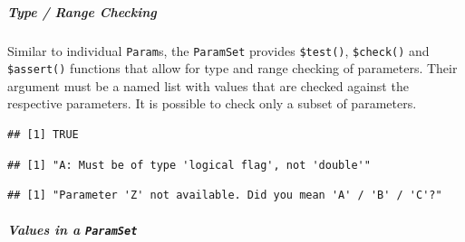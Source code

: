 \documentclass[]{article}
\newenvironment{Shaded}{\begin{snugshade}}{\end{snugshade}}
\newcommand{\DataTypeTok}[1]{\textcolor[rgb]{0.13,0.29,0.53}{#1}}
\newcommand{\DecValTok}[1]{\textcolor[rgb]{0.00,0.00,0.81}{#1}}
\newcommand{\KeywordTok}[1]{\textcolor[rgb]{0.13,0.29,0.53}{\textbf{#1}}}
\newcommand{\NormalTok}[1]{#1}
\newcommand{\OperatorTok}[1]{\textcolor[rgb]{0.81,0.36,0.00}{\textbf{#1}}}
\newcommand{\OtherTok}[1]{\textcolor[rgb]{0.56,0.35,0.01}{#1}}
\let\oldsubparagraph\subparagraph
\renewcommand{\subparagraph}[1]{\oldsubparagraph{#1}\mbox{}}
\renewenvironment{Shaded} {\begin{snugshade}\small} {\end{snugshade}}
\begin{document}
\hypertarget{type-range-checking-1}{%
\subparagraph{Type / Range Checking}\label{type-range-checking-1}}

Similar to individual \texttt{Param}s, the \texttt{ParamSet} provides \texttt{\$test()}, \texttt{\$check()} and \texttt{\$assert()} functions that allow for type and range checking of parameters.
Their argument must be a named list with values that are checked against the respective parameters.
It is possible to check only a subset of parameters.

\begin{Shaded}
\end{Shaded}

\begin{verbatim}
## [1] TRUE
\end{verbatim}

\begin{Shaded}
\end{Shaded}

\begin{verbatim}
## [1] "A: Must be of type 'logical flag', not 'double'"
\end{verbatim}

\begin{Shaded}
\end{Shaded}

\begin{verbatim}
## [1] "Parameter 'Z' not available. Did you mean 'A' / 'B' / 'C'?"
\end{verbatim}

\hypertarget{values-in-a-paramset}{%
\subparagraph{\texorpdfstring{Values in a \texttt{ParamSet}}{Values in a ParamSet}}\label{values-in-a-paramset}}
\end{document}
